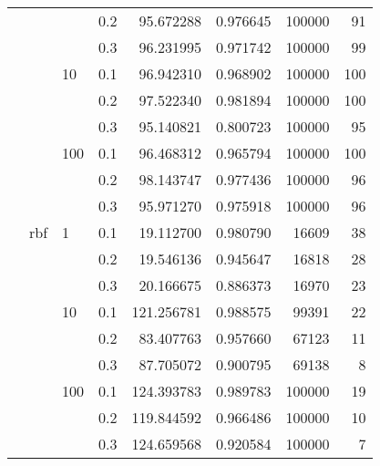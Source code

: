 \begin{table}[H]
\begin{tabular}{llllrrrr}
           &     &     & 0.2 &   95.672288 &  0.976645 &  100000 &    91 \\
           &     &     & 0.3 &   96.231995 &  0.971742 &  100000 &    99 \\
           &     & 10  & 0.1 &   96.942310 &  0.968902 &  100000 &   100 \\
           &     &     & 0.2 &   97.522340 &  0.981894 &  100000 &   100 \\
           &     &     & 0.3 &   95.140821 &  0.800723 &  100000 &    95 \\
           &     & 100 & 0.1 &   96.468312 &  0.965794 &  100000 &   100 \\
           &     &     & 0.2 &   98.143747 &  0.977436 &  100000 &    96 \\
           &     &     & 0.3 &   95.971270 &  0.975918 &  100000 &    96 \\
           & rbf & 1   & 0.1 &   19.112700 &  0.980790 &   16609 &    38 \\
           &     &     & 0.2 &   19.546136 &  0.945647 &   16818 &    28 \\
           &     &     & 0.3 &   20.166675 &  0.886373 &   16970 &    23 \\
           &     & 10  & 0.1 &  121.256781 &  0.988575 &   99391 &    22 \\
           &     &     & 0.2 &   83.407763 &  0.957660 &   67123 &    11 \\
           &     &     & 0.3 &   87.705072 &  0.900795 &   69138 &     8 \\
           &     & 100 & 0.1 &  124.393783 &  0.989783 &  100000 &    19 \\
           &     &     & 0.2 &  119.844592 &  0.966486 &  100000 &    10 \\
           &     &     & 0.3 &  124.659568 &  0.920584 &  100000 &     7 \\
\bottomrule
\end{tabular}
\end{table}
